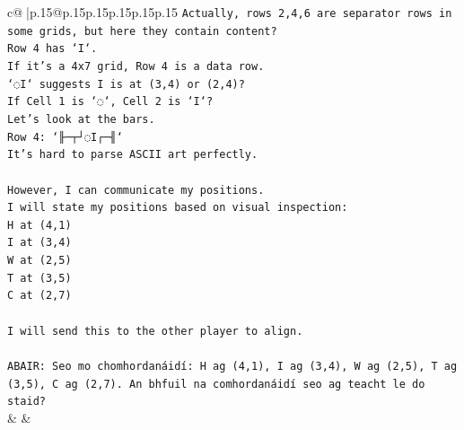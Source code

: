 \documentclass{article}
\begin{document}
{\begin{supertabular}{c@{$\;$}|p{.15\linewidth}@{}p{.15\linewidth}p{.15\linewidth}p{.15\linewidth}p{.15\linewidth}p{.15\linewidth}}
{{{\texttt{Actually, rows 2,4,6 are separator rows in some grids, but here they contain content?} \\
\texttt{Row 4 has `I`.} \\
\texttt{If it's a 4x7 grid, Row 4 is a data row.} \\
\texttt{`◌I` suggests I is at (3,4) or (2,4)?} \\
\texttt{If Cell 1 is `◌`, Cell 2 is `I`?} \\
\texttt{Let's look at the bars.} \\
\texttt{Row 4: `╟─┬┘◌I┌─╢`} \\
\texttt{It's hard to parse ASCII art perfectly.} \\
\\ 
\texttt{However, I can communicate my positions.} \\
\texttt{I will state my positions based on visual inspection:} \\
\texttt{H at (4,1)} \\
\texttt{I at (3,4)} \\
\texttt{W at (2,5)} \\
\texttt{T at (3,5)} \\
\texttt{C at (2,7)} \\
\\ 
\texttt{I will send this to the other player to align.} \\
\\ 
\texttt{ABAIR: Seo mo chomhordanáidí: H ag (4,1), I ag (3,4), W ag (2,5), T ag (3,5), C ag (2,7). An bhfuil na comhordanáidí seo ag teacht le do staid?} \\
            }
        }
    }
    & & \\ \\


\end{supertabular}}
\end{document}
